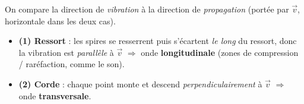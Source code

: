 \documentclass[11pt,a4paper]{article}
\newcommand{\vv}[1]{\vec{#1}}\newcommand{\ds}{\displaystyle}
\begin{document}
\begin{corrige}
On compare la direction de \emph{vibration} à la direction de \emph{propagation} (portée par
$\vv v$, horizontale dans les deux cas).
\begin{itemize}[leftmargin=1.4em,topsep=2pt,itemsep=3pt]
  \item \textbf{(1) Ressort} : les spires se resserrent puis s'écartent \emph{le long} du
        ressort, donc la vibration est \emph{parallèle} à $\vv v$ $\Rightarrow$ onde
        \textbf{longitudinale} (zones de compression / raréfaction, comme le son).
  \item \textbf{(2) Corde} : chaque point monte et descend \emph{perpendiculairement} à
        $\vv v$ $\Rightarrow$ onde \textbf{transversale}.
\end{itemize}
\end{corrige}
\end{document}
